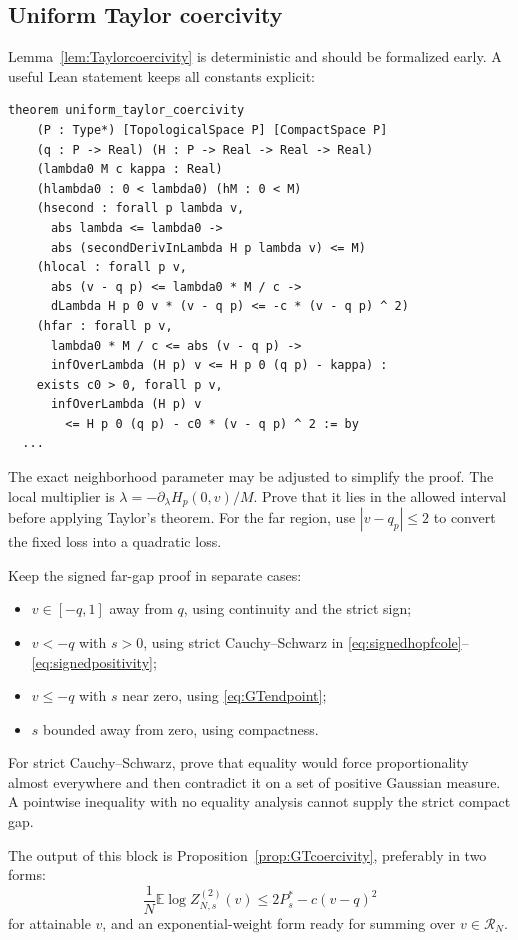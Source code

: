 \documentclass[11pt]{article}
\numberwithin{equation}{section}
\newcommand{\E}{\mathbb{E}}
\newcommand{\1}{\mathbf 1}
\begin{document}
\subsection{Uniform Taylor coercivity}

Lemma~\ref{lem:Taylorcoercivity} is deterministic and should be formalized
early.  A useful Lean statement keeps all constants explicit:
\begin{lstlisting}
theorem uniform_taylor_coercivity
    (P : Type*) [TopologicalSpace P] [CompactSpace P]
    (q : P -> Real) (H : P -> Real -> Real -> Real)
    (lambda0 M c kappa : Real)
    (hlambda0 : 0 < lambda0) (hM : 0 < M)
    (hsecond : forall p lambda v,
      abs lambda <= lambda0 ->
      abs (secondDerivInLambda H p lambda v) <= M)
    (hlocal : forall p v,
      abs (v - q p) <= lambda0 * M / c ->
      dLambda H p 0 v * (v - q p) <= -c * (v - q p) ^ 2)
    (hfar : forall p v,
      lambda0 * M / c <= abs (v - q p) ->
      infOverLambda (H p) v <= H p 0 (q p) - kappa) :
    exists c0 > 0, forall p v,
      infOverLambda (H p) v
        <= H p 0 (q p) - c0 * (v - q p) ^ 2 := by
  ...
\end{lstlisting}
The exact neighborhood parameter may be adjusted to simplify the proof.
The local multiplier is
$\lambda=-\partial_\lambda H_p(0,v)/M$.  Prove that it lies in the allowed
interval before applying Taylor's theorem.  For the far region, use
$|v-q_p|\le2$ to convert the fixed loss into a quadratic loss.

Keep the signed far-gap proof in separate cases:
\begin{itemize}[leftmargin=2em]
\item $v\in[-q,1]$ away from $q$, using continuity and the strict sign;
\item $v<-q$ with $s>0$, using strict Cauchy--Schwarz in
      \eqref{eq:signedhopfcole}--\eqref{eq:signedpositivity};
\item $v\le-q$ with $s$ near zero, using \eqref{eq:GTendpoint};
\item $s$ bounded away from zero, using compactness.
\end{itemize}
For strict Cauchy--Schwarz, prove that equality would force proportionality
almost everywhere and then contradict it on a set of positive Gaussian
measure.  A pointwise inequality with no equality analysis cannot supply the
strict compact gap.

The output of this block is Proposition~\ref{prop:GTcoercivity}, preferably
in two forms:
\[
 \frac1N\E\log Z_{N,s}^{(2)}(v)
 \le2P_s^*-c(v-q)^2
\]
for attainable $v$, and an exponential-weight form ready for summing over
$v\in\mathcal R_N$.
\end{document}
